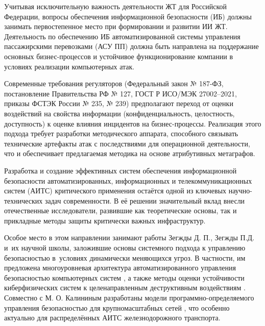 Учитывая исключительную важность деятельности ЖТ для Российской Федерации, вопросы обеспечения информационной безопасности (ИБ)
\ifsynopsis
\else
{}
\fi должны занимать первостепенное место при формировании и развитии ИИ ЖТ. Деятельность по обеспечению ИБ автоматизированной системы управления пассажирскими перевозками (АСУ ПП)
\ifsynopsis
\else
{}
\fi должна быть направлена на поддержание основных бизнес-процессов и устойчивое функционирование компании в условиях реализации компьютерных атак.

Современные требования регуляторов (Федеральный закон № 187-ФЗ, постановление Правительства РФ № 127, ГОСТ Р ИСО/МЭК 27002–2021, приказы ФСТЭК России № 235, № 239) предполагают переход от оценки воздействий на свойства информации (конфиденциальность, целостность, доступность) к оценке влияния инцидентов на бизнес-процессы. Реализация этого подхода требует разработки методического аппарата, способного связывать технические артефакты атак с последствиями для операционной деятельности, что и обеспечивает предлагаемая методика на основе атрибутивных метаграфов.
\fi


{\progress}

Разработка и создание эффективных систем обеспечения информационной безопасности автоматизированных, информационных и телекоммуникационных систем (АИТС)
\ifsynopsis
\else
{}
\fi 
критического применения остаётся одной из ключевых научно-технических задач современности. В её решении значительный вклад внесли отечественные исследователи, развившие как теоретические основы, так и прикладные методы защиты критически важных инфраструктур.

Особое место в этом направлении занимают работы Зегжды Д. П., Зегжды П.Д. и~их научной школы, заложившие основы системного подхода к управлению безопасностью в~условиях динамически меняющихся угроз. В частности, им предложена многоуровневая архитектура автоматизированного управления безопасностью компьютерных систем \autocite{Zegzhda2020}, а также методы оценки устойчивости киберфизических систем к целенаправленным деструктивным воздействиям \autocite{Pavlenko2018}. Совместно с М. О. Калининым разработаны модели программно-определяемого управления безопасностью для крупномасштабных сетей \autocite{Kalinin2018}, что особенно актуально для распределённых АИТС железнодорожного транспорта.

